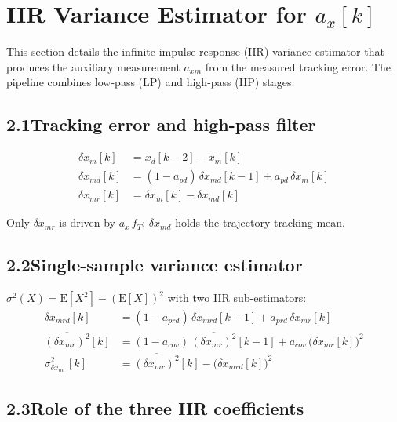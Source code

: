 \documentclass[11pt]{article}
\begin{document}
\section{IIR Variance Estimator for $a_x[k]$}

This section details the infinite impulse response (IIR) variance estimator that produces the auxiliary measurement $a_{xm}$ from the measured tracking error. The pipeline combines low-pass (LP) and high-pass (HP) stages.

\subsection*{2.1\quad Tracking error and high-pass filter}

\begin{align}
\delta x_m[k]    &= x_d[k\!-\!2] - x_m[k] \\[2pt]
\delta x_{md}[k] &= (1-a_{pd})\,\delta x_{md}[k\!-\!1] + a_{pd}\,\delta x_m[k] \\[2pt]
\delta x_{mr}[k] &= \delta x_m[k] - \delta x_{md}[k]
\end{align}

\noindent Only $\delta x_{mr}$ is driven by $a_x\,f_T$; $\delta x_{md}$ holds the trajectory-tracking mean.

\subsection*{2.2\quad Single-sample variance estimator}

$\sigma^{2}(X) = \mathrm{E}[X^{2}] - (\mathrm{E}[X])^{2}$ with two IIR sub-estimators:
\begin{align}
\delta x_{mrd}[k]                  &= (1-a_{prd})\,\delta x_{mrd}[k\!-\!1] + a_{prd}\,\delta x_{mr}[k] \\[2pt]
\overline{(\delta x_{mr})^{2}}[k]  &= (1-a_{cov})\,\overline{(\delta x_{mr})^{2}}[k\!-\!1]
  + a_{cov}\,\bigl(\delta x_{mr}[k]\bigr)^{2} \\[2pt]
\sigma^{2}_{\delta x_{mr}}[k]      &= \overline{(\delta x_{mr})^{2}}[k] - \bigl(\delta x_{mrd}[k]\bigr)^{2}
\end{align}

\subsection*{2.3\quad Role of the three IIR coefficients}
\end{document}
